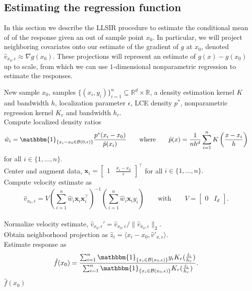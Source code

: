 \documentclass[11pt]{article}
\begin{document}
\subsection{Estimating the regression function} \label{sec: regression est}

In this section we describe the LLSIR procedure to estimate the conditional mean of of the response given an out of sample point $x_0$. In particular, we will project neighboring covariates onto our estimate of the gradient of $g$ at $x_0$, denoted $\hat v_{x_0, \epsilon} \approx \nabla g(x_0)$. These projections will represent an estimate of $g(x) - g(x_0)$ up to scale, from which we can use $1$-dimensional nonparametric regression to estimate the responses.

\begin{algorithm}[h]
    \begin{algorithmic}[1]
        \caption{Locally Linear Single Index Regression (LLSIR)}
        \label{alg: LLSIR}
        \Require New sample $x_0$, samples $\{(x_i, y_i)\}_{i=1}^n \subseteq \mathbb{R}^d \times \mathbb{R}$, a density estimation kernel $K$ and bandwidth $h$, localization parameter $\epsilon$, LCE density $p^*$, nonparametric regression kernel $K_r$ and bandwidth $h_r$.\\
        Compute localized density ratios \[\hat{w}_i = \mathbbm{1}_{\{x_i - x_0 \in \mathcal{B}(0, \epsilon)\}}\frac{p^*(x_i - x_0)}{\hat p(x_i) } \qquad \text{where} \qquad \hat p(x) = \frac{1}{nh^d}\sum_{i = 1}^nK\left(\frac{x -x_i}{h}\right)\]for all $i \in \{1, \dots, n\}$. \\
        Center and augment data, $\boldsymbol{x}_i = \begin{bmatrix}
            1 & \frac{x_i - x_0}{\epsilon}
        \end{bmatrix}^{\top}$ for all $i \in \{1, \dots , n\}.$ \\
        Compute velocity estimate as 
        \[ \hat{v}_{x_0, \epsilon} = V\left(\sum_{i = 1}^n\hat{w}_i\boldsymbol{x}_i\boldsymbol{x}_i^{\top}\right)^{-1}\left(\sum_{i = 1}^n\hat{w}_i\boldsymbol{x}_iy_i\right) \qquad \text{with} \qquad V = \begin{bmatrix}
            0 & I_d
        \end{bmatrix}.\] \\
        Normalize velocity estimate, $\hat v_{x_0, \epsilon}' = \hat v_{x_0, \epsilon} /\|\hat v_{x_0, \epsilon}\|_2$.\\
        Obtain neighborhood projection as $\hat{z}_i = \langle x_i - x_0, \hat{v}'_{x, \epsilon} \rangle$. \\
        Estimate response as 
        \begin{equation} \label{eq: kernel regressor}
            \hat{f}(x_0) = \frac{\sum_{i=1}^n \mathbbm{1}_{\{x_i\in \mathcal{B}(x_0, \epsilon)\}}y_iK_r(\frac{\hat{z}_i}{h_r})}{\sum_{i=1}^n \mathbbm{1}_{\{x_i\in \mathcal{B}(x_0, \epsilon)\}}K_r(\frac{\hat{z}_i}{h_r})}.
        \end{equation}
        \Return $\hat{f}(x_0)$
    \end{algorithmic}
\end{algorithm}
\end{document}
